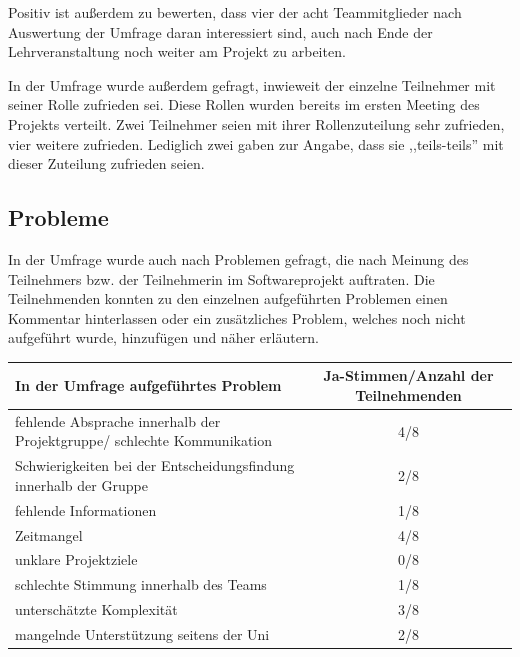 \documentclass[../review_3.tex]{subfiles}
\begin{document}
Positiv ist außerdem zu bewerten, dass vier der acht Teammitglieder nach Auswertung der Umfrage daran interessiert sind, auch nach Ende der Lehrveranstaltung noch weiter am Projekt zu arbeiten.

In der Umfrage wurde außerdem gefragt, inwieweit der einzelne Teilnehmer mit seiner Rolle zufrieden sei. Diese Rollen wurden bereits im ersten Meeting des Projekts verteilt.
Zwei Teilnehmer seien mit ihrer Rollenzuteilung sehr zufrieden, vier weitere zufrieden. Lediglich zwei gaben zur Angabe, dass sie ,,teils-teils'' mit dieser Zuteilung zufrieden seien.

\subsection{Probleme}
In der Umfrage wurde auch nach Problemen gefragt, die nach Meinung des Teilnehmers bzw. der Teilnehmerin im Softwareprojekt auftraten. Die Teilnehmenden konnten zu den einzelnen aufgeführten Problemen einen Kommentar hinterlassen oder ein zusätzliches Problem, welches noch nicht aufgeführt wurde, hinzufügen und näher erläutern.

\begin{longtable}[h]{p{} c}
    \toprule
    \textbf{In der Umfrage aufgeführtes Problem}                            & \textbf{Ja-Stimmen/Anzahl der Teilnehmenden} \\ \midrule \endhead
    fehlende Absprache innerhalb der Projektgruppe/ schlechte Kommunikation & 4/8                                          \\
    Schwierigkeiten bei der Entscheidungsfindung innerhalb der Gruppe       & 2/8                                          \\
    fehlende Informationen                                                  & 1/8                                          \\
    Zeitmangel                                                              & 4/8                                          \\
    unklare Projektziele                                                    & 0/8                                          \\
    schlechte Stimmung innerhalb des Teams                                  & 1/8                                          \\
    unterschätzte Komplexität                                               & 3/8                                          \\
    mangelnde Unterstützung seitens der Uni                                 & 2/8                                          \\ \bottomrule
\end{longtable}
\end{document}
